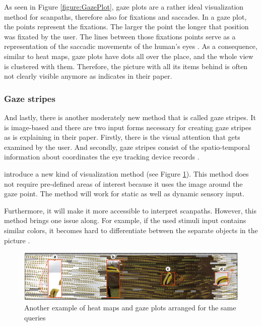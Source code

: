 As seen in Figure \ref{figure:GazePlot}, gaze plots are a rather ideal visualization method for scanpaths, therefore also for fixations and saccades. In a gaze plot, the points represent the fixations. The larger the point the longer that position was fixated by the user. The lines between those fixations points serve as a representation of the saccadic movements of the human's eyes \autocite[]{djamasbi2014eye}.
As a consequence, similar to heat maps, gaze plots have dots all over the place, and the whole view is clustered with them. Therefore, the picture with all its items behind is often not clearly visible anymore as \textcite[]{djamasbi2014eye} indicates in their paper.

\subsubsection{Gaze stripes}
And lastly, there is another moderately new method that is called gaze stripes. It is image-based and there are two input forms necessary for creating gaze stripes as \textcite{kurzhals2016gaze} is explaining in their paper. Firstly, there is the visual attention that gets examined by the user. And secondly, gaze stripes consist of the spatio-temporal information about coordinates the eye tracking device records \autocite{kurzhals2016gaze}.

\textcite[]{kurzhals2016gaze} introduce a new kind of visualization method (see Figure \ref{figure:GazeStripes}). This method does not require pre-defined areas of interest because it uses the image around the gaze point. The method will work for static as well as dynamic sensory input. 

Furthermore, it will make it more accessible to interpret scanpaths. However, this method brings one issue along. For example, if the used stimuli input contains similar colors, it becomes hard to differentiate between the separate objects in the picture \autocite[]{kurzhals2016gaze}.

\begin{figure}[!ht]
    \centering
    \includegraphics[width=1\linewidth]{images/GazeStripes_kurzhals2016gaze.png}
    \caption{
       Another example of heat maps and gaze plots  arranged for the same queries \autocite[1005]{kurzhals2016gaze}
    }
    \label{figure:GazeStripes}
\end{figure}


